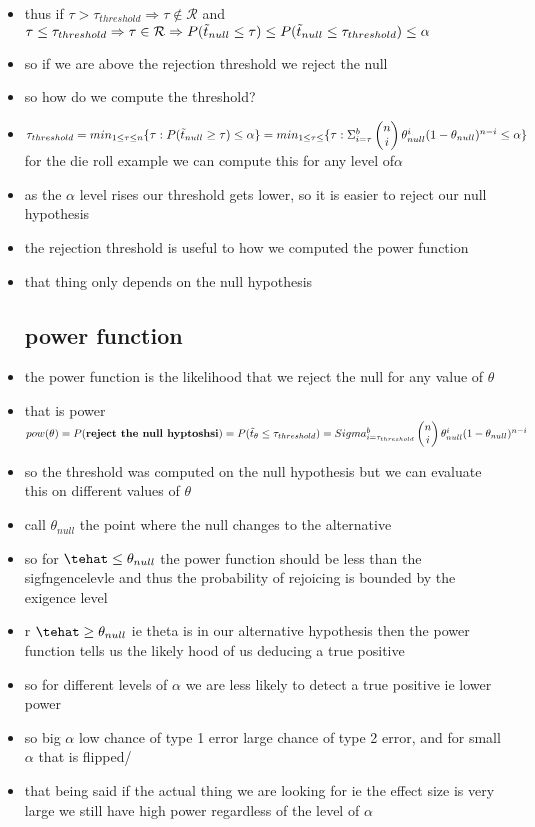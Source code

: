 \documentclass{article}
\begin{document}
\begin{itemize}
\item thus if $\tau>  \tau_{threshold}\Rightarrow \tau\not\in \mathcal{R}$ and $\tau\leq \tau_{threshold}\Rightarrow \tau\in \mathcal{R}\Rightarrow P(\Tilde{t}_{null}\leq \tau)\leq P(\Tilde{t}_{null}\leq \tau_{threshold})\leq \alpha$
\item so if we are above the rejection threshold we reject the null 
\item so how do we compute the threshold? 
\item $\tau_{threshold}=min_{1\leq \tau \leq n}\{ \tau:P(\Tilde{t}_{null}\geq\tau)\leq \alpha \}=min_{1\leq \tau\leq }\{\tau :\Sigma_{i=\tau}^{b}\begin{pmatrix}n\\i\end{pmatrix}\theta^{i}_{null}(1-\theta_{null})^{n-i}\leq \alpha\}$ for the die roll example we can compute this for any level of$\alpha$
\item as the $\alpha$ level rises our threshold gets lower, so it is easier to reject our null hypothesis 
\item the rejection threshold is useful to how we computed the power function 
\item that thing only depends on the null hypothesis 
\subsection{power function}
\item the power function is the likelihood that we reject the null for any value of $\theta$
\item that is power
$pow(\theta)=P(\textbf{reject the null hyptoshsi})=P(\Tilde{t}_{\theta}\leq \tau_{threshold})=Sigma_{i=\tau_{threshold}}^{b}\begin{pmatrix}n\\i\end{pmatrix}\theta^{i}_{null}(1-\theta_{null})^{n-i}$ 
\item so the threshold was computed on the null hypothesis but we can evaluate this on different values of $\theta$
\item call $\theta_{null}$ the point where the null changes to the alternative
\item so for $\tehat\leq \theta_{null}$ the power function should be less than the sigfngencelevle and thus the probability of rejoicing is bounded by the exigence level 
\item r $\tehat\geq \theta_{null}$ ie theta is in our alternative hypothesis then the power function tells us the likely hood of us deducing a true positive
\item so for different levels of $\alpha$ we are less likely to detect a true positive ie lower power
\item so big $\alpha$ low chance of type 1 error large chance of type 2 error, and for small $\alpha$ that is flipped/
\item that being said if the actual thing we are looking for ie the effect size is very large we still have high power regardless of the level of $\alpha$

\end{itemize}
\end{document}
